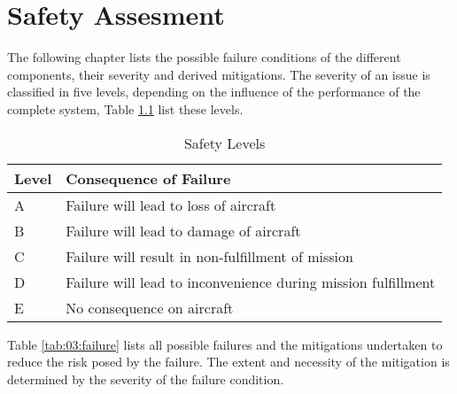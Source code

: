 \chapter{Safety Assesment}
The following chapter lists the possible failure conditions
of the different components, their severity and derived
mitigations. The severity of an issue is classified in 
five levels, depending on the influence of the performance
of the complete system, Table \ref{tab:03:severityLevels}
list these levels.

\begin{table}[H]
    \centering
    \begin{tabular}{ll}
        \toprule 
        Level & Consequence of Failure \\
        \midrule
        A & Failure will lead to loss of aircraft \\
        B & Failure will lead to damage of aircraft \\
        C & Failure will result in non-fulfillment of mission \\ 
        D & Failure will lead to inconvenience during mission fulfillment \\
        E & No consequence on aircraft \\
        \bottomrule
    \end{tabular}
    \caption{Safety Levels}
    \label{tab:03:severityLevels}
\end{table}

Table \ref{tab:03:failure} lists all possible failures
and the mitigations undertaken to reduce the risk posed
by the failure. The extent and necessity of the mitigation
is determined by the severity of the failure condition.


